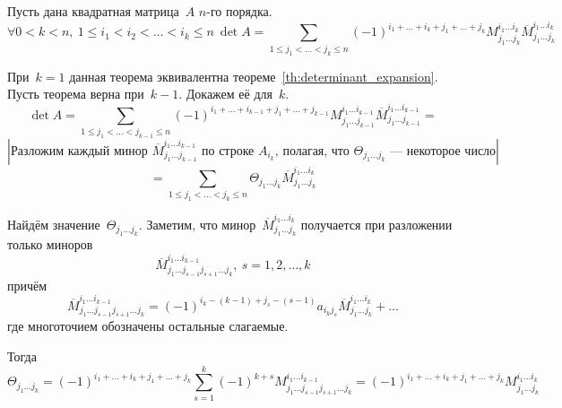 \begin{theorem}[Лапл\'{а}са]
Пусть дана квадратная матрица~$A$ $n$-го порядка.
\begin{equation*}
\forall 0 < k < n, \ 1 \leqslant i_1 < i_2 < \ldots < i_k \leqslant n \
\det A = \sum_{1 \leqslant j_1 < \ldots < j_k \leqslant n}
(-1)^{i_1 + \ldots + i_k + j_1 + \ldots + j_k}
M_{j_1 \ldots j_k}^{i_1 \ldots i_k}
\overline M_{j_1 \ldots j_k}^{i_1 \ldots i_k}
\end{equation*}
\end{theorem}
\begin{proofmathind}
	\indbase При~$k = 1$ данная теорема эквивалентна теореме~\ref*{th:determinant_expansion}.
	\indstep Пусть теорема верна при~$k - 1$. Докажем её для~$k$.
	\begin{equation*}
	\det A = \sum_{1 \leqslant j_1 < \ldots < j_{k-1} \leqslant n}
	(-1)^{i_1 + \ldots + i_{k-1} + j_1 + \ldots + j_{k-1}}
	M_{j_1 \ldots j_{k-1}}^{i_1 \ldots i_{k-1}}
	\overline M_{j_1 \ldots j_{k-1}}^{i_1 \ldots i_{k-1}} =
	\end{equation*}
	\begin{equation*}
	\left| \text{Разложим каждый минор~$\overline M_{j_1 \ldots j_{k-1}}^{i_1 \ldots i_{k-1}}$ по строке~$A_{i_k}$, полагая, что $\Theta_{j_1 \ldots j_k}$~--- некоторое число} \right|
	\end{equation*}
	\begin{equation*}
	= \sum_{1 \leqslant j_1 < \ldots < j_k \leqslant n}
	\Theta_{j_1 \ldots j_k} \overline M_{j_1 \ldots j_k}^{i_1 \ldots i_k}
	\end{equation*}
	
	Найдём значение~$\Theta_{j_1 \ldots j_k}$.
	Заметим, что минор~$\overline M_{j_1 \ldots j_k}^{i_1 \ldots i_k}$ получается при разложении только миноров
	\begin{equation*}
	\overline M_{j_1 \ldots j_{s-1} j_{s+1} \ldots j_k}^{i_1 \ldots i_{k-1}}, \ s = 1, 2, \ldots, k
	\end{equation*}
	причём
	\begin{equation*}
	\overline M_{j_1 \ldots j_{s-1} j_{s+1} \ldots j_k}^{i_1 \ldots i_{k-1}} =
	(-1)^{i_k - (k - 1) + j_s - (s - 1)} a_{i_k j_s}
	\overline M_{j_1 \ldots j_k}^{i_1 \ldots i_k} + \ldots
	\end{equation*}
	где многоточием обозначены остальные слагаемые.
	
	Тогда
	\begin{equation*}
	\Theta_{j_1 \ldots j_k} =
	(-1)^{i_1 + \ldots + i_k + j_1 + \ldots + j_k}
	\sum_{s=1}^k (-1)^{k+s} M_{j_1 \ldots j_{s-1} j_{s+1} \ldots j_k}^{i_1 \ldots i_{k-1}} =
	(-1)^{i_1 + \ldots + i_k + j_1 + \ldots + j_k}
	M_{j_1 \ldots j_k}^{i_1 \ldots i_k}
	\end{equation*}
	\indend
\end{proofmathind}

